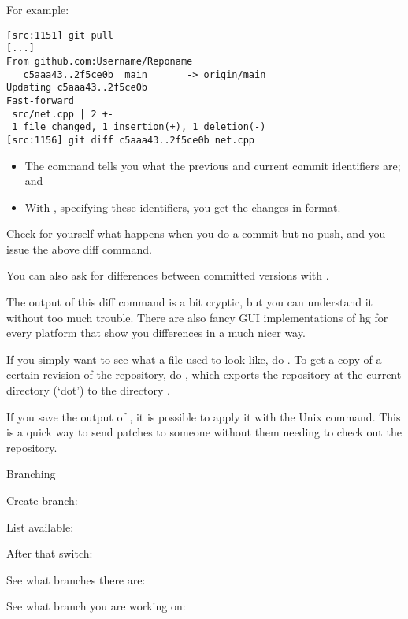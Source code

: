 For example:
\begin{verbatim}
[src:1151] git pull
[...]
From github.com:Username/Reponame
   c5aaa43..2f5ce0b  main       -> origin/main
Updating c5aaa43..2f5ce0b
Fast-forward
 src/net.cpp | 2 +-
 1 file changed, 1 insertion(+), 1 deletion(-)
[src:1156] git diff c5aaa43..2f5ce0b net.cpp
\end{verbatim}
\begin{itemize}
\item The  command tells you what the previous and current
  commit identifiers are; and
\item With , specifying these identifiers, you get the changes
  in  format.
\end{itemize}

Check for yourself what happens when you do a commit but no push, and 
you issue the above diff command.

You can also ask for differences between committed versions with
.

The output of this diff command is a bit cryptic, but you can
understand it without too much trouble. There are also fancy GUI
implementations of hg for every platform that show you differences in
a much nicer way.

If you simply want to see what a file used to look like, do . To get a copy of a certain revision of the
repository, do , which exports the
repository at the current directory (`dot') to the directory .

If you save the output of , it is possible to apply it
with the Unix  command. This is a quick way to send patches
to someone without them needing to check out the repository.

 {Branching}

Create branch:


List available:


After that switch:




See what branches there are: 

See what branch you are working on: 


